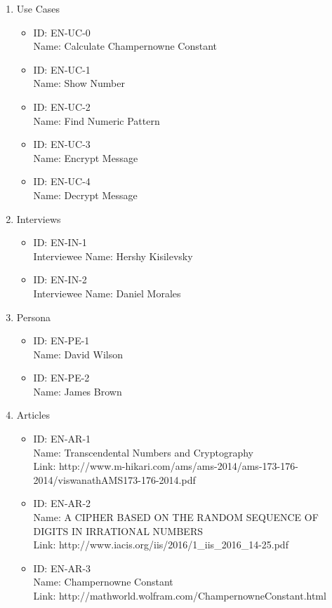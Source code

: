 \documentclass{report}
\begin{document}
\begin{enumerate}
    \item Use Cases
    \begin{itemize}
        \item ID: EN-UC-0 \\
              Name: Calculate Champernowne Constant
        \item ID: EN-UC-1 \\
              Name: Show Number
        \item ID: EN-UC-2 \\
              Name: Find Numeric Pattern
        \item ID: EN-UC-3 \\
              Name: Encrypt Message
        \item ID: EN-UC-4 \\
              Name: Decrypt Message
    \end{itemize}
    
    \item Interviews
        \begin{itemize}
        \item ID: EN-IN-1 \\
              Interviewee Name: Hershy Kisilevsky
        \item ID: EN-IN-2 \\
              Interviewee Name: Daniel Morales
        \end{itemize}
    
    \item Persona
        \begin{itemize}
        \item ID: EN-PE-1 \\
              Name: David Wilson
        \item ID: EN-PE-2 \\
              Name: James Brown
        \end{itemize}
        
    \item Articles
        \begin{itemize}
        \item ID: EN-AR-1 \\
              Name: Transcendental Numbers and Cryptography \\
              Link: http://www.m-hikari.com/ams/ams-2014/ams-173-176-2014/viswanathAMS173-176-2014.pdf
        \item ID: EN-AR-2 \\
              Name: A CIPHER BASED ON THE RANDOM SEQUENCE OF DIGITS IN IRRATIONAL NUMBERS \\
              Link: http://www.iacis.org/iis/2016/1\_iis\_2016\_14-25.pdf
        \item ID: EN-AR-3 \\
              Name: Champernowne Constant \\
              Link: http://mathworld.wolfram.com/ChampernowneConstant.html \\ \newline
        \end{itemize}
        
\end{enumerate}
\end{document}
